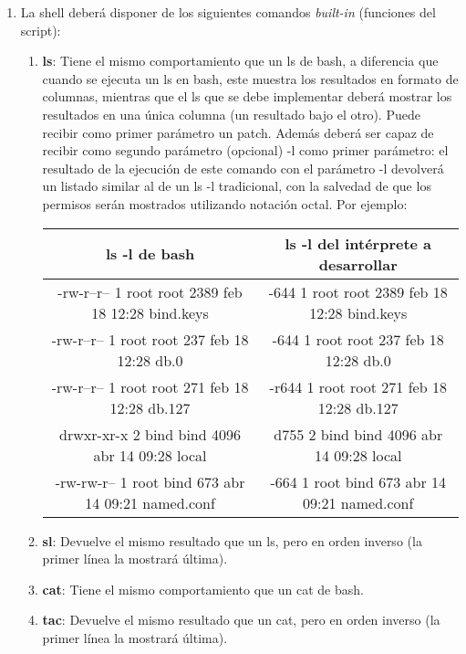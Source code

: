 \begin{enumerate}
\begin{enumerate}
	    \item La shell deberá disponer de los siguientes comandos \textit{built-in} (funciones del script):
	    \begin{enumerate}
	     \item \textbf{ls}: Tiene el mismo comportamiento que un ls de bash, a diferencia que cuando se ejecuta un ls en bash, este muestra los resultados en formato de columnas, mientras que el ls que se debe implementar deberá mostrar los resultados en una única columna (un resultado bajo el otro). Puede recibir como primer parámetro un patch. Además deberá ser capaz de recibir como segundo parámetro (opcional) -l como primer parámetro: el resultado de la ejecución de este comando con el parámetro -l devolverá un listado similar al de un ls -l tradicional, con la salvedad de que los permisos serán mostrados utilizando notación octal. Por ejemplo:
	     \begin{table}[th]
		    \centering
		    \begin{tabular}{| c | c |}
			    \hline
			    \bf ls -l de bash & \bf ls -l del intérprete a desarrollar \\
			    \hline
			    -rw-r--r-- 1 root root 2389 feb 18 12:28 bind.keys & -644 1 root root 2389 feb 18 12:28 bind.keys \\ 
			    \hline
			    -rw-r--r-- 1 root root 237 feb 18 12:28 db.0 & -644 1 root root 237 feb 18 12:28 db.0 \\
			    \hline
			    -rw-r--r-- 1 root root 271 feb 18 12:28 db.127 & -r644 1 root root 271 feb 18 12:28 db.127 \\
			    \hline
			    drwxr-xr-x 2 bind bind 4096 abr 14 09:28 local & d755 2 bind bind 4096 abr 14 09:28 local \\
			    \hline
			    -rw-rw-r-- 1 root bind 673 abr 14 09:21 named.conf & -664 1 root bind 673 abr 14 09:21 named.conf \\
			    \hline
		    \end{tabular}
	     \end{table}
	     
	     \item \textbf{sl}: Devuelve el mismo resultado que un ls, pero en orden inverso (la primer línea la mostrará última).

	     \item \textbf{cat}: Tiene el mismo comportamiento que un cat de bash.

	     \item \textbf{tac}: Devuelve el mismo resultado que un cat, pero en orden inverso (la primer línea la mostrará última).


\end{enumerate}
\end{enumerate}
\end{enumerate}
